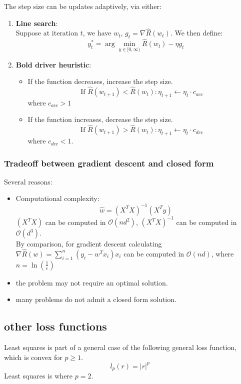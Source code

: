 \documentclass[a4paper,10pt,twoside]{article}
\begin{document}
The step size can be updates adaptively, via either:
\begin{enumerate}
    \item \textbf{Line search}:\\
    Suppose at iteration $t$, we have $w_t$, $g_t=\nabla\hat{R}(w_t)$. We then define:
    \begin{equation*}
        y_t^{*} = \arg\min_{y\in[0,\infty)}\hat{R}(w_t)-\eta g_t
    \end{equation*}
    \item \textbf{Bold driver heuristic}:
    \begin{itemize}
        \item If the function decreases, increase the step size.
        \begin{equation*}
            \text{If }\hat{R}(w_{t+1})<\hat{R}(w_{t}): \eta_{t+1}\leftarrow\eta_{t}\cdot c_{acc}
        \end{equation*}
        where $c_{acc}>1$
        \item If the function increases, decrease the step size.
        \begin{equation*}
            \text{If }\hat{R}(w_{t+1})>\hat{R}(w_{t}): \eta_{t+1}\leftarrow\eta_{t}\cdot c_{dec}
        \end{equation*}
        where $c_{dec}<1$.
    \end{itemize}
\end{enumerate}
\subsubsection{Tradeoff between gradient descent and closed form}
Several reasons:
\begin{itemize}
    \item Computational complexity:
    \begin{equation*}
        \hat{w}=(X^TX)^{-1}(X^Ty)
    \end{equation*}
    $(X^TX)$ can be computed in $\mathcal{O}(nd^2)$, $(X^TX)^{-1}$ can be computed in $\mathcal{O}(d^3)$.\\
    By comparison, for gradient descent calculating $\nabla\hat{R}(w)=\sum_{i=1}^{n}(y_i-w^Tx_i)x_i$ can be computed in $\mathcal{O}(nd)$, where $n=\ln(\frac{1}{\epsilon})$
    \item the problem may not require an optimal solution.
    \item many problems do not admit a closed form solution.
\end{itemize}
\subsection{other loss functions}
Least squares is part of a general case of the following general loss function, which is convex for $p\geq 1$.
\begin{equation}
    l_p(r)=|r|^p
\end{equation}
Least squares is where $p=2$.
\end{document}
